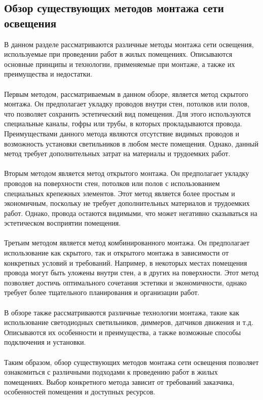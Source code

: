 \documentclass{article}
\begin{document}
\subsection{Обзор существующих методов монтажа сети освещения}
В данном разделе рассматриваются различные методы монтажа сети освещения, используемые при проведении работ в жилых помещениях. Описываются основные принципы и технологии, применяемые при монтаже, а также их преимущества и недостатки.\\
~\\
Первым методом, рассматриваемым в данном обзоре, является метод скрытого монтажа. Он предполагает укладку проводов внутри стен, потолков или полов, что позволяет сохранить эстетический вид помещения. Для этого используются специальные каналы, гофры или трубы, в которых прокладываются провода. Преимуществами данного метода являются отсутствие видимых проводов и возможность установки светильников в любом месте помещения. Однако, данный метод требует дополнительных затрат на материалы и трудоемких работ.\\
~\\
Вторым методом является метод открытого монтажа. Он предполагает укладку проводов на поверхности стен, потолков или полов с использованием специальных крепежных элементов. Этот метод является более простым и экономичным, поскольку не требует дополнительных материалов и трудоемких работ. Однако, провода остаются видимыми, что может негативно сказываться на эстетическом восприятии помещения.\\
~\\
Третьим методом является метод комбинированного монтажа. Он предполагает использование как скрытого, так и открытого монтажа в зависимости от конкретных условий и требований. Например, в некоторых местах помещения провода могут быть уложены внутри стен, а в других  на поверхности. Этот метод позволяет достичь оптимального сочетания эстетики и экономичности, однако требует более тщательного планирования и организации работ.\\
~\\
В обзоре также рассматриваются различные технологии монтажа, такие как использование светодиодных светильников, диммеров, датчиков движения и т.д. Описываются их особенности и преимущества, а также возможные способы подключения и установки.\\
~\\
Таким образом, обзор существующих методов монтажа сети освещения позволяет ознакомиться с различными подходами к проведению работ в жилых помещениях. Выбор конкретного метода зависит от требований заказчика, особенностей помещения и доступных ресурсов.
\end{document}

